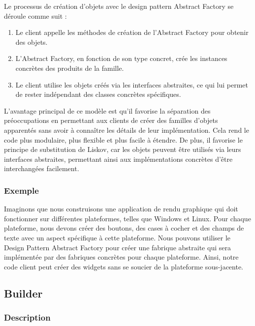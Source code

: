 \documentclass[french]{article}
\begin{document}
Le processus de création d'objets avec le design pattern Abstract Factory se déroule comme suit :

\begin{enumerate}
    \item Le client appelle les méthodes de création de l'Abstract Factory pour obtenir des objets.
    \item L'Abstract Factory, en fonction de son type concret, crée les instances concrètes des produits de la famille.
    \item Le client utilise les objets créés via les interfaces abstraites, ce qui lui permet de rester indépendant des classes concrètes spécifiques.
\end{enumerate}

L'avantage principal de ce modèle est qu'il favorise la séparation des préoccupations en permettant aux clients de créer des familles d'objets apparentés sans avoir à connaître les détails de leur implémentation. Cela rend le code plus modulaire, plus flexible et plus facile à étendre. De plus, il favorise le principe de substitution de Liskov, car les objets peuvent être utilisés via leurs interfaces abstraites, permettant ainsi aux implémentations concrètes d'être interchangées facilement.

\subsubsection{Exemple}

Imaginons que nous construisons une application de rendu graphique qui doit fonctionner sur différentes plateformes, telles que Windows et Linux. Pour chaque plateforme, nous devons créer des boutons, des cases à cocher et des champs de texte avec un aspect spécifique à cette plateforme. Nous pouvons utiliser le Design Pattern Abstract Factory pour créer une fabrique abstraite qui sera implémentée par des fabriques concrètes pour chaque plateforme. Ainsi, notre code client peut créer des widgets sans se soucier de la plateforme sous-jacente.







\subsection{Builder}

\subsubsection{Description}
\end{document}
